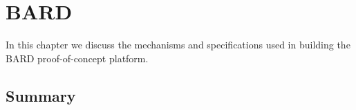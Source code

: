 %

\acresetall

\chapter{BARD}
\label{ch:BARD}


In this chapter we discuss the mechanisms and specifications used in building the \ac{BARD} proof-of-concept platform.











  
\section{Summary}
\label{sec:SummaryBARD}



